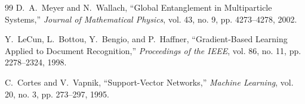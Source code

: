 \documentclass[pdflatex,sn-mathphys-num]{sn-jnl}%
\theoremstyle{thmstyleone}%
\theoremstyle{thmstyletwo}%
\theoremstyle{thmstylethree}%
\begin{document}
\begin{thebibliography}{99}
D.~A.~Meyer and N.~Wallach,
``Global Entanglement in Multiparticle Systems,''
\emph{Journal of Mathematical Physics}, vol. 43, no. 9,
pp. 4273--4278, 2002.

Y.~LeCun, L.~Bottou, Y.~Bengio, and P.~Haffner,
``Gradient-Based Learning Applied to Document Recognition,''
\emph{Proceedings of the IEEE}, vol. 86, no. 11,
pp. 2278--2324, 1998.

C.~Cortes and V.~Vapnik,
``Support-Vector Networks,''
\emph{Machine Learning}, vol. 20, no. 3,
pp. 273--297, 1995.

\end{thebibliography}
\end{document}

